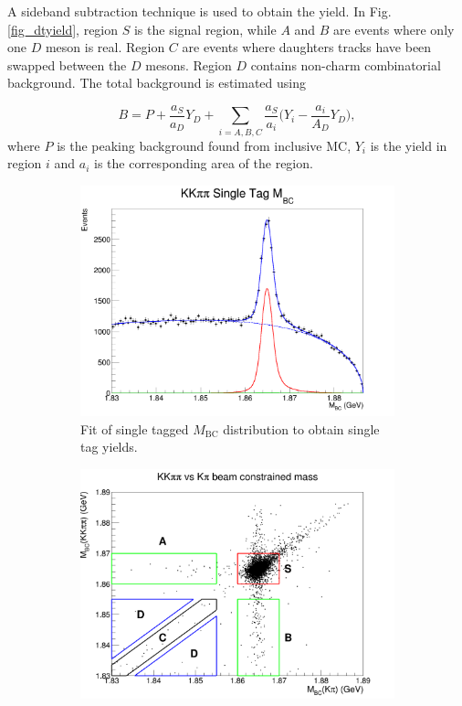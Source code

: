 \documentclass[12pt, a4paper, notitlepage, onecolumn]{article}
\numberwithin{equation}{section}
\begin{document}
A sideband subtraction technique is used to obtain the yield. In Fig. \ref{fig_dtyield}, region $S$ is the signal region, while $A$ and $B$ are events where only one $D$ meson is real. Region $C$ are events where daughters tracks have been swapped between the $D$ mesons. Region $D$ contains non-charm  combinatorial background. The total background is estimated using

\begin{equation*}
  B = P + \frac{a_S}{a_D}Y_D + \sum_{i = A, B, C}\frac{a_S}{a_i}\Big(Y_i - \frac{a_i}{A_D}Y_D\Big),
\end{equation*}
where $P$ is the peaking background found from inclusive MC, $Y_i$ is the yield in region $i$ and $a_i$ is the corresponding area of the region.

\begin{figure}[H] 
  \centering
  \begin{subfigure}{0.5\textwidth}
    \centering
    \includegraphics[width=1\textwidth]{Plots/KKpipiSingleTagMBCPlot.png}
    \caption{Fit of single tagged $M_\text{BC}$ distribution to obtain single tag yields.}
    \label{fig_styield}
  \end{subfigure}%
  \begin{subfigure}{0.5\textwidth}
    \centering
    \includegraphics[width=1\textwidth]{Plots/KpiDoubleTagYield.png}

\end{subfigure}
\end{figure}
\end{document}
